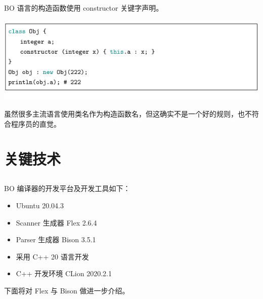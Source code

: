 \documentclass[dvipsnames, svgnames, x11names]{beamer}
\begin{document}
\begin{frame}
    \onslide<+-> BO 语言的构造函数使用 constructor 关键字声明。

    \begin{center}
    \onslide<+-> \includegraphics{../figure/characteristic2.pdf}
    \end{center}

    \onslide<+-> 虽然很多主流语言使用类名作为构造函数名，但这确实不是一个好的规则，也不符合程序员的直觉。
\end{frame}






\section{关键技术}

\subsection*{}
\begin{frame}
    \onslide<+-> BO 编译器的开发平台及开发工具如下：
    \begin{itemize}[<+->]
        \item Ubuntu 20.04.3
        \item Scanner 生成器 Flex 2.6.4
        \item Parser 生成器 Bison 3.5.1
        \item 采用 C++ 20 语言开发
        \item C++ 开发环境 CLion 2020.2.1
    \end{itemize}
    \onslide<+-> 下面将对 Flex 与 Bison 做进一步介绍。
\end{frame}
\end{document}
